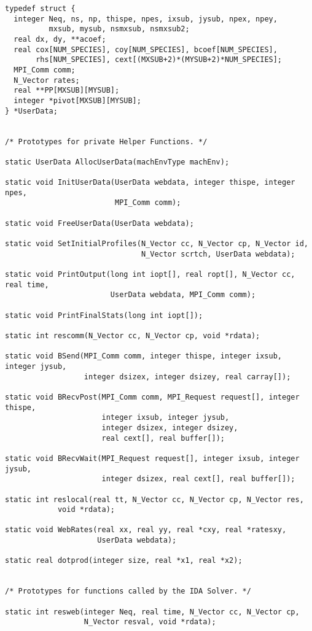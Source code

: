 \begin{verbatim}
typedef struct {
  integer Neq, ns, np, thispe, npes, ixsub, jysub, npex, npey,
          mxsub, mysub, nsmxsub, nsmxsub2;
  real dx, dy, **acoef;
  real cox[NUM_SPECIES], coy[NUM_SPECIES], bcoef[NUM_SPECIES],
       rhs[NUM_SPECIES], cext[(MXSUB+2)*(MYSUB+2)*NUM_SPECIES];
  MPI_Comm comm;
  N_Vector rates;
  real **PP[MXSUB][MYSUB];
  integer *pivot[MXSUB][MYSUB];
} *UserData;


/* Prototypes for private Helper Functions. */

static UserData AllocUserData(machEnvType machEnv);

static void InitUserData(UserData webdata, integer thispe, integer npes, 
                         MPI_Comm comm);

static void FreeUserData(UserData webdata);

static void SetInitialProfiles(N_Vector cc, N_Vector cp, N_Vector id,
                               N_Vector scrtch, UserData webdata);

static void PrintOutput(long int iopt[], real ropt[], N_Vector cc, real time,
                        UserData webdata, MPI_Comm comm);

static void PrintFinalStats(long int iopt[]);

static int rescomm(N_Vector cc, N_Vector cp, void *rdata);

static void BSend(MPI_Comm comm, integer thispe, integer ixsub, integer jysub,
                  integer dsizex, integer dsizey, real carray[]);

static void BRecvPost(MPI_Comm comm, MPI_Request request[], integer thispe,
                      integer ixsub, integer jysub,
                      integer dsizex, integer dsizey,
                      real cext[], real buffer[]);

static void BRecvWait(MPI_Request request[], integer ixsub, integer jysub,
                      integer dsizex, real cext[], real buffer[]);

static int reslocal(real tt, N_Vector cc, N_Vector cp, N_Vector res, 
		    void *rdata);

static void WebRates(real xx, real yy, real *cxy, real *ratesxy, 
                     UserData webdata);

static real dotprod(integer size, real *x1, real *x2);


/* Prototypes for functions called by the IDA Solver. */

static int resweb(integer Neq, real time, N_Vector cc, N_Vector cp,
                  N_Vector resval, void *rdata);


\end{verbatim}
